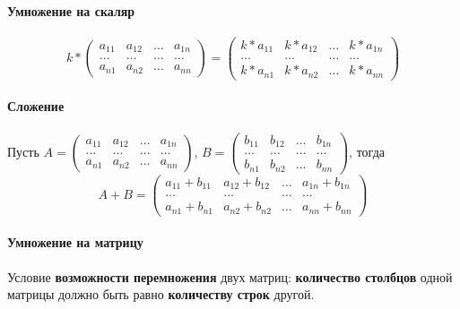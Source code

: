 \documentclass{article}
\begin{document}
\begin{flushleft}
\paragraph{Умножение на скаляр}

$$k * \begin{pmatrix}
    a_{11} & a_{12} & \dots & a_{1n} \\
    \dots & \dots & \dots & \dots \\
    a_{n1} & a_{n2} & \dots & a_{n n}
\end{pmatrix} = \begin{pmatrix}
    k * a_{11} & k * a_{12} & \dots & k * a_{1n} \\
    \dots & \dots & \dots & \dots \\
    k * a_{n1} & k * a_{n2} & \dots & k * a_{n n}
\end{pmatrix}$$

\paragraph{Сложение}

Пусть $A = \begin{pmatrix}
    a_{11} & a_{12} & \dots & a_{1n} \\
    \dots & \dots & \dots & \dots \\
    a_{n1} & a_{n2} & \dots & a_{n n}
\end{pmatrix}$, $B = \begin{pmatrix}
    b_{11} & b_{12} & \dots & b_{1n} \\
    \dots & \dots & \dots & \dots \\
    b_{n1} & b_{n2} & \dots & b_{n n}
\end{pmatrix}$, тогда $$A + B = \begin{pmatrix}
    a_{11} + b_{11} & a_{12} + b_{12} & \dots & a_{1n} + b_{1n} \\
    \dots & \dots & \dots & \dots \\
    a_{n1} + b_{n1} & a_{n2} + b_{n2} & \dots & a_{n n} + b_{n n}
\end{pmatrix}$$

\paragraph{Умножение на матрицу}

Условие \textbf{возможности перемножения} двух матриц: \textbf{количество столбцов} одной матрицы должно быть равно \textbf{количеству строк} другой.


\end{flushleft}
\end{document}
